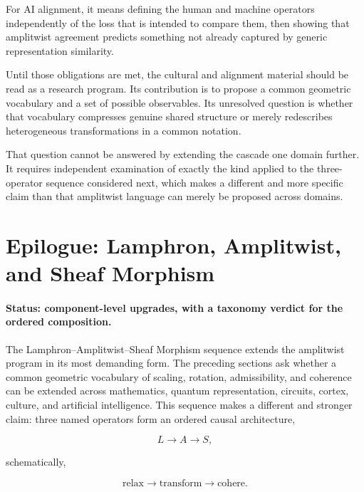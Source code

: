 \documentclass[11pt]{article}
\begin{document}
For AI alignment, it means defining the human and machine operators independently of the loss that is intended to compare them, then showing that amplitwist agreement predicts something not already captured by generic representation similarity.

Until those obligations are met, the cultural and alignment material should be read as a research program. Its contribution is to propose a common geometric vocabulary and a set of possible observables. Its unresolved question is whether that vocabulary compresses genuine shared structure or merely redescribes heterogeneous transformations in a common notation.

That question cannot be answered by extending the cascade one domain further. It requires independent examination of exactly the kind applied to the three-operator sequence considered next, which makes a different and more specific claim than that amplitwist language can merely be proposed across domains.

\section{Epilogue: Lamphron, Amplitwist, and Sheaf Morphism}

\paragraph{Status: component-level upgrades, with a taxonomy verdict for the ordered composition.}

The Lamphron--Amplitwist--Sheaf Morphism sequence \citep{FlyxionLamphrodynamic,FlyxionTartan} extends the amplitwist program in its most demanding form. The preceding sections ask whether a common geometric vocabulary of scaling, rotation, admissibility, and coherence can be extended across mathematics, quantum representation, circuits, cortex, culture, and artificial intelligence. This sequence makes a different and stronger claim: three named operators form an ordered causal architecture,

\begin{equation}
L\longrightarrow A\longrightarrow S,
\end{equation}

schematically,

\begin{equation}
\text{relax}
\longrightarrow
\text{transform}
\longrightarrow
\text{cohere}.
\end{equation}
\end{document}
